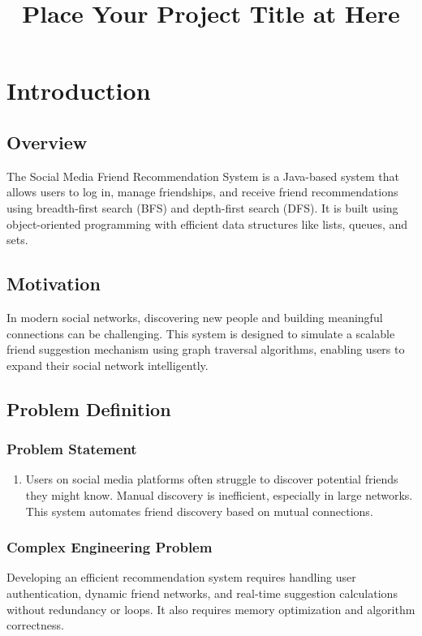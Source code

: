 \documentclass[12pt]{report}
\title{Place Your Project Title at Here}
\begin{document}
    
    \tableofcontents
  


\newpage
\chapter{Introduction}

\section{Overview}

The Social Media Friend Recommendation System is a Java-based system that allows
users to log in, manage friendships, and receive friend recommendations using breadth-first search (BFS) and depth-first search (DFS). It is built using object-oriented programming with efficient data structures like lists, queues, and sets.

\section{Motivation}
In modern social networks, discovering new people and building meaningful connections
can be challenging. This system is designed to simulate a scalable friend suggestion
mechanism using graph traversal algorithms, enabling users to expand their social network
intelligently.

\section{Problem Definition}

\subsection{Problem Statement}
\begin{enumerate}
    \item Users on social media platforms often struggle to discover potential friends they might
know. Manual discovery is inefficient, especially in large networks. This system automates
friend discovery based on mutual connections.

\end{enumerate}

\subsection{Complex Engineering Problem}
Developing an efficient recommendation system requires handling user authentication,
dynamic friend networks, and real-time suggestion calculations without redundancy or
loops. It also requires memory optimization and algorithm correctness.
\end{document}
